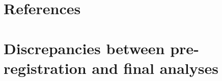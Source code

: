 \documentclass[
  ,man,floatsintext]{apa6}
\newlength{\cslhangindent}
\newlength{\cslentryspacingunit} %
\newenvironment{CSLReferences}[2] %
 {%
  \setlength{\parindent}{0pt}
  \ifodd #1
  \let\oldpar\par
  \def\par{\hangindent=\cslhangindent\oldpar}
  \fi
  \setlength{\parskip}{#2\cslentryspacingunit}
 }%
 {}
\begin{document}
\newpage

\hypertarget{references}{%
\section{References}\label{references}}

\begingroup
\setlength{\parindent}{-0.5in}
\setlength{\leftskip}{0.5in}

\hypertarget{refs}{}
\begin{CSLReferences}{0}{0}
\end{CSLReferences}

\endgroup

\newpage

\newpage

\hypertarget{appendix-appendix}{%
\appendix}


\hypertarget{discrepancies-between-pre-registration-and-final-analyses}{%
\section{Discrepancies between pre-registration and final analyses}\label{discrepancies-between-pre-registration-and-final-analyses}}
\end{document}
